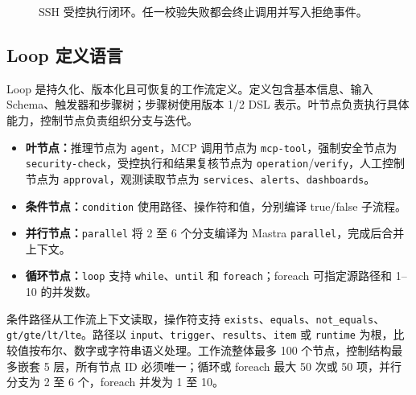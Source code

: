 \documentclass[conference,10pt]{IEEEtran}
\newcommand{\code}[1]{\texttt{#1}}
\begin{document}
\begin{figure}[t]
\centering
{}
\caption{SSH 受控执行闭环。任一校验失败都会终止调用并写入拒绝事件。}
\label{fig:ssh-execution}
\end{figure}

\subsection{Loop 定义语言}

Loop 是持久化、版本化且可恢复的工作流定义。定义包含基本信息、输入 Schema、触发器和步骤树；步骤树使用版本 1/2 DSL 表示。叶节点负责执行具体能力，控制节点负责组织分支与迭代。

\begin{itemize}
  \item \textbf{叶节点：}推理节点为 \code{agent}，MCP 调用节点为 \code{mcp-tool}，强制安全节点为 \code{security-check}，受控执行和结果复核节点为 \code{operation}/\code{verify}，人工控制节点为 \code{approval}，观测读取节点为 \code{services}、\code{alerts}、\code{dashboards}。
  \item \textbf{条件节点：}\code{condition} 使用路径、操作符和值，分别编译 true/false 子流程。
  \item \textbf{并行节点：}\code{parallel} 将 2 至 6 个分支编译为 Mastra \code{parallel}，完成后合并上下文。
  \item \textbf{循环节点：}\code{loop} 支持 \code{while}、\code{until} 和 \code{foreach}；foreach 可指定源路径和 1--10 的并发数。
\end{itemize}

条件路径从工作流上下文读取，操作符支持 \code{exists}、\code{equals}、\code{not\_equals}、\code{gt/gte/lt/lte}。路径以 \code{input}、\code{trigger}、\code{results}、\code{item} 或 \code{runtime} 为根，比较值按布尔、数字或字符串语义处理。工作流整体最多 100 个节点，控制结构最多嵌套 5 层，所有节点 ID 必须唯一；循环或 foreach 最大 50 次或 50 项，并行分支为 2 至 6 个，foreach 并发为 1 至 10。
\end{document}
